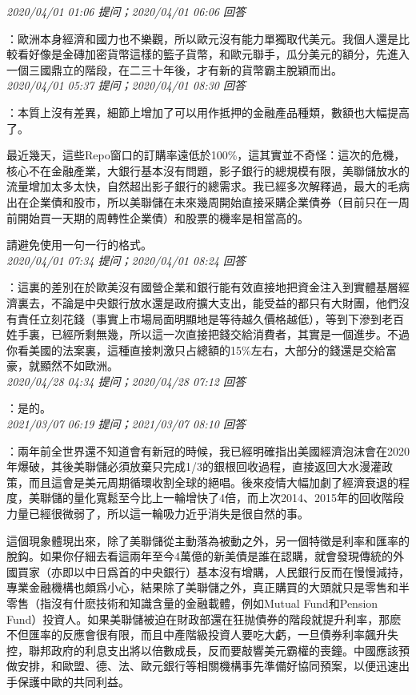 \documentclass[twocolumn]{ctexart}
\begin{document}
\textit{\hfill\noindent\small 2020/04/01 01:06 提问；2020/04/01 06:06 回答}

：歐洲本身經濟和國力也不樂觀，所以歐元沒有能力單獨取代美元。我個人還是比較看好像是金磚加密貨幣這樣的籃子貨幣，和歐元聯手，瓜分美元的額分，先進入一個三國鼎立的階段，在二三十年後，才有新的貨幣霸主脫穎而出。
\\

\textit{\hfill\noindent\small 2020/04/01 05:37 提问；2020/04/01 08:30 回答}

：本質上沒有差異，細節上增加了可以用作抵押的金融產品種類，數額也大幅提高了。

最近幾天，這些Repo窗口的訂購率遠低於100\%，這其實並不奇怪：這次的危機，核心不在金融產業，大銀行基本沒有問題，影子銀行的總規模有限，美聯儲放水的流量增加太多太快，自然超出影子銀行的總需求。我已經多次解釋過，最大的毛病出在企業債和股市，所以美聯儲在未來幾周開始直接采購企業債券（目前只在一周前開始買一天期的周轉性企業債）和股票的機率是相當高的。

請避免使用一句一行的格式。
\\

\textit{\hfill\noindent\small 2020/04/01 07:34 提问；2020/04/01 08:24 回答}

：這裏的差別在於歐美沒有國營企業和銀行能有效直接地把資金注入到實體基層經濟裏去，不論是中央銀行放水還是政府擴大支出，能受益的都只有大財團，他們沒有責任立刻花錢（事實上市場局面明顯地是等待越久價格越低），等到下滲到老百姓手裏，已經所剩無幾，所以這一次直接把錢交給消費者，其實是一個進步。不過你看美國的法案裏，這種直接刺激只占總額的15\%左右，大部分的錢還是交給富豪，就顯然不如歐洲。
\\

\textit{\hfill\noindent\small 2020/04/28 04:34 提问；2020/04/28 07:12 回答}

：是的。
\\

\textit{\hfill\noindent\small 2021/03/07 06:19 提问；2021/03/07 08:10 回答}

：兩年前全世界還不知道會有新冠的時候，我已經明確指出美國經濟泡沫會在2020年爆破，其後美聯儲必須放棄只完成1/3的銀根回收過程，直接返回大水漫灌政策，而且這會是美元周期循環收割全球的絕唱。後來疫情大幅加劇了經濟衰退的程度，美聯儲的量化寬鬆至今比上一輪增快了4倍，而上次2014、2015年的回收階段力量已經很微弱了，所以這一輪吸力近乎消失是很自然的事。

這個現象體現出來，除了美聯儲從主動落為被動之外，另一個特徵是利率和匯率的脫鈎。如果你仔細去看這兩年至今4萬億的新美債是誰在認購，就會發現傳統的外國買家（亦即以中日爲首的中央銀行）基本沒有增購，人民銀行反而在慢慢減持，專業金融機構也頗爲小心，結果除了美聯儲之外，真正購買的大頭就只是零售和半零售（指沒有什麽技術和知識含量的金融載體，例如Mutual Fund和Pension Fund）投資人。如果美聯儲被迫在財政部還在狂抛債券的階段就提升利率，那麽不但匯率的反應會很有限，而且中產階級投資人要吃大虧，一旦債券利率飆升失控，聯邦政府的利息支出將以倍數成長，反而要敲響美元霸權的喪鐘。中國應該預做安排，和歐盟、德、法、歐元銀行等相關機構事先準備好協同預案，以便迅速出手保護中歐的共同利益。
\end{document}
